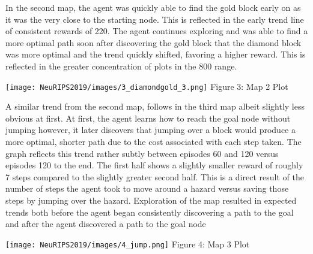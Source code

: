 \documentclass{article}
\begin{document}
In the second map, the agent was quickly able to find the gold block early on as it was the very close to the starting node. This is reflected in the early trend line of consistent rewards of 220. The agent continues exploring and was able to find a more optimal path soon after discovering the gold block that the diamond block was more optimal and the trend quickly shifted, favoring a higher reward. This is reflected in the greater concentration of plots in the 800 range. \\
\begin{center}
    \texttt{[image: NeuRIPS2019/images/3\_diamondgold\_3.png]}
    \center Figure 3: Map 2 Plot
\end{center}

A similar trend from the second map, follows in the third map albeit slightly less obvious at first. At first, the agent learns how to reach the goal node without jumping however, it later discovers that jumping over a block would produce a more optimal, shorter path due to the cost associated with each step taken. The graph reflects this trend rather subtly between episodes 60 and 120 versus episodes 120 to the end. The first half shows a slightly smaller reward of roughly 7 steps compared to the slightly greater second half. This is a direct result of the number of steps the agent took to move around a hazard versus saving those steps by jumping over the hazard. Exploration of the map resulted in expected trends both before the agent began consistently discovering a path to the goal and after the agent discovered a path to the goal node\\
\begin{center}
    \texttt{[image: NeuRIPS2019/images/4\_jump.png]}
    \center Figure 4: Map 3 Plot
\end{center}
\end{document}
